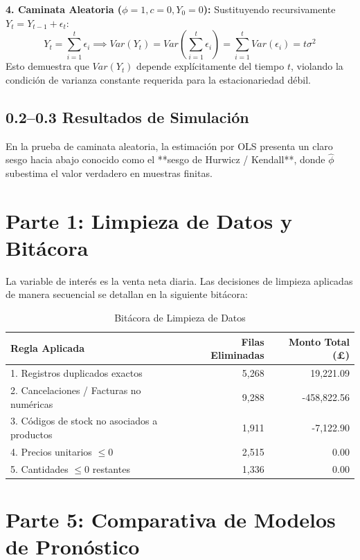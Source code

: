 \documentclass[11pt,a4paper]{article}
\begin{document}
\textbf{4. Caminata Aleatoria ($\phi=1, c=0, Y_0=0$):}
Sustituyendo recursivamente $Y_t = Y_{t-1} + \epsilon_t$:
\begin{equation*}
Y_t = \sum_{i=1}^t \epsilon_i \implies Var(Y_t) = Var\left(\sum_{i=1}^t \epsilon_i\right) = \sum_{i=1}^t Var(\epsilon_i) = t\sigma^2
\end{equation*}
Esto demuestra que $Var(Y_t)$ depende explícitamente del tiempo $t$, violando la condición de varianza constante requerida para la estacionariedad débil.

\subsection{0.2--0.3 Resultados de Simulación}

En la prueba de caminata aleatoria, la estimación por OLS presenta un claro sesgo hacia abajo conocido como el **sesgo de Hurwicz / Kendall**, donde $\hat{\phi}$ subestima el valor verdadero en muestras finitas.

\section{Parte 1: Limpieza de Datos y Bitácora}

La variable de interés es la venta neta diaria. Las decisiones de limpieza aplicadas de manera secuencial se detallan en la siguiente bitácora:

\begin{table}[H]
\centering
\caption{Bitácora de Limpieza de Datos}
\begin{tabular}{lrr}
\toprule
\textbf{Regla Aplicada} & \textbf{Filas Eliminadas} & \textbf{Monto Total (£)} \\
\midrule
1. Registros duplicados exactos & 5,268 & 19,221.09 \\
2. Cancelaciones / Facturas no numéricas & 9,288 & -458,822.56 \\
3. Códigos de stock no asociados a productos & 1,911 & -7,122.90 \\
4. Precios unitarios $\le 0$ & 2,515 & 0.00 \\
5. Cantidades $\le 0$ restantes & 1,336 & 0.00 \\
\bottomrule
\end{tabular}
\end{table}

\section{Parte 5: Comparativa de Modelos de Pronóstico}
\end{document}
